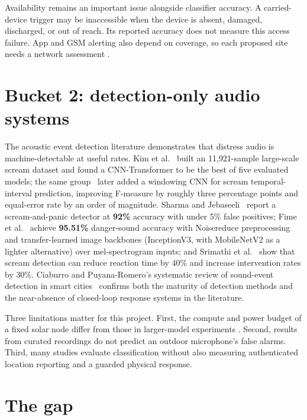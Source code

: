 \documentclass[12pt,a4paper]{report}
\begin{document}
Availability remains an important issue alongside classifier
accuracy. A carried-device trigger may be inaccessible when the
device is absent, damaged, discharged, or out of reach. Its reported
accuracy does not measure this access failure. App and GSM alerting
also depend on coverage, so each proposed site needs a network
assessment \cite{uganya}.

\section{Bucket 2: detection-only audio systems}
\label{sec:bucket2}

The acoustic event detection literature
\cite{kimwindow,sharma,srimathi,kimscream,fime} demonstrates that
distress audio is machine-detectable at useful rates. Kim et
al.~\cite{kimscream} built an 11{,}921-sample large-scale scream
dataset and found a CNN-Transformer to be the best of five evaluated
models; the same group~\cite{kimwindow} later added a windowing CNN
for scream temporal-interval prediction, improving F-measure by
roughly three percentage points and equal-error rate by an order of
magnitude. Sharma and Jebaseeli~\cite{sharma} report a
scream-and-panic detector at \textbf{92\%} accuracy with under 5\%
false positives; Fime et al.~\cite{fime} achieve \textbf{95.51\%}
danger-sound accuracy with Noisereduce preprocessing and
transfer-learned image backbones (InceptionV3, with MobileNetV2 as a
lighter alternative) over mel-spectrogram inputs; and Srimathi et
al.~\cite{srimathi} show that scream detection can reduce reaction
time by 40\% and increase intervention rates by 30\%. Ciaburro and
Puyana-Romero's systematic review of sound-event detection in smart
cities~\cite{ciaburro} confirms both the maturity of detection methods
and the near-absence of closed-loop response systems in the
literature.

Three limitations matter for this project. First, the compute and
power budget of a fixed solar node differ from those in larger-model
experiments \cite{kimwindow,kimscream}. Second, results from curated
recordings do not predict an outdoor microphone's false alarms.
Third, many studies evaluate classification without also measuring
authenticated location reporting and a guarded physical response.

\section{The gap}
\label{sec:gap}
\end{document}
